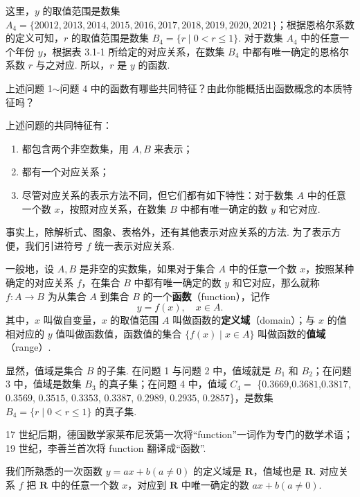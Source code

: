 \documentclass[a4paper,11pt]{ctexart}
\begin{document}
	这里，\(y\) 的取值范围是数集 \(A_4 = \{20012, 2013, 2014, 2015, 2016, 2017, 2018, 2019, 2020, 2021\}\)；根据恩格尔系数的定义可知，\(r\) 的取值范围是数集 \(B_4 = \{r \mid 0 < r \leqslant 1\}\). 对于数集 \(A_4\) 中的任意一个年份 \(y\)，根据表 3.1-1 所给定的对应关系，在数集 \(B_4\) 中都有唯一确定的恩格尔系数 \(r\) 与之对应. 所以，\(r\) 是 \(y\) 的函数.
	
	\begin{summarybox}[归纳]
		上述问题 1\(\sim\)问题 4 中的函数有哪些共同特征？由此你能概括出函数概念的本质特征吗？
	\end{summarybox}
	
	上述问题的共同特征有：
	\begin{enumerate}[label=(\arabic*)]
		\item 都包含两个非空数集，用 \(A, B\) 来表示；
		\item 都有一个对应关系；
		\item 尽管对应关系的表示方法不同，但它们都有如下特性：对于数集 \(A\) 中的任意一个数 \(x\)，按照对应关系，在数集 \(B\) 中都有唯一确定的数 \(y\) 和它对应.
	\end{enumerate}
	
	事实上，除解析式、图象、表格外，还有其他表示对应关系的方法. 为了表示方便，我们引进符号 \(f\) 统一表示对应关系.
	
	一般地，设 \(A, B\) 是非空的实数集，如果对于集合 \(A\) 中的任意一个数 \(x\)，按照某种确定的对应关系 \(f\)，在集合 \(B\) 中都有唯一确定的数 \(y\) 和它对应，那么就称 \(f: A \to B\) 为从集合 \(A\) 到集合 \(B\) 的一个\textbf{函数}（function），记作
	\[
	y = f(x), \quad x \in A.
	\]
	其中，\(x\) 叫做自变量，\(x\) 的取值范围 \(A\) 叫做函数的\textbf{定义域}（domain）；与 \(x\) 的值相对应的 \(y\) 值叫做函数值，函数值的集合 \(\{f(x) \mid x \in A\}\) 叫做函数的\textbf{值域}（range）.
	
	显然，值域是集合 \(B\) 的子集. 在问题 1 与问题 2 中，值域就是 \(B_1\) 和 \(B_2\)；在问题 3 中，值域是数集 \(B_3\) 的真子集；在问题 4 中，值域 $C_4 =$ \{$0.3669$,$ 0.3681$,$ 0.3817$, $0.3569$, $0.3515$, $0.3353$, $0.3387$, $0.2989$, $0.2935$, $0.2857$\}，是数集 \(B_4 = \{r \mid 0 < r \leqslant 1\}\) 的真子集.
	
	\begin{thinkbox}[思考]
		17 世纪后期，德国数学家莱布尼茨第一次将“function”一词作为专门的数学术语；19 世纪，李善兰首次将 function 翻译成“函数”.
	\end{thinkbox}
	
	
	
	我们所熟悉的一次函数 \(y = ax + b (a \neq 0)\) 的定义域是 \(\mathbf{R}\)，值域也是 \(\mathbf{R}\). 对应关系 \(f\) 把 \(\mathbf{R}\) 中的任意一个数 \(x\)，对应到 \(\mathbf{R}\) 中唯一确定的数 \(ax + b (a \neq 0)\).
	
\end{document}
